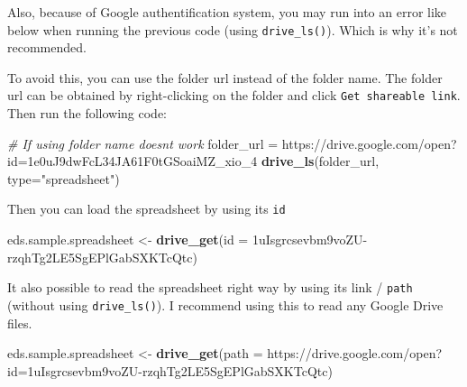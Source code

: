\documentclass[
]{book}
\newenvironment{Shaded}{\begin{snugshade}}{\end{snugshade}}
\newcommand{\CommentTok}[1]{\textcolor[rgb]{0.56,0.35,0.01}{\textit{#1}}}
\newcommand{\DataTypeTok}[1]{\textcolor[rgb]{0.13,0.29,0.53}{#1}}
\newcommand{\KeywordTok}[1]{\textcolor[rgb]{0.13,0.29,0.53}{\textbf{#1}}}
\newcommand{\NormalTok}[1]{#1}
\newcommand{\StringTok}[1]{\textcolor[rgb]{0.31,0.60,0.02}{#1}}
\begin{document}
Also, because of Google authentification system, you may run into an error like below when running the previous code (using \texttt{drive\_ls()}). Which is why it's not recommended.

\begin{Shaded}
\end{Shaded}

To avoid this, you can use the folder url instead of the folder name. The folder url can be obtained by right-clicking on the folder and click \texttt{Get\ shareable\ link}. Then run the following code:

\begin{Shaded}
\begin{Highlighting}[]
\CommentTok{\# If using folder name doesn\textquotesingle{}t work}
\NormalTok{folder\_url =}\StringTok{ \textquotesingle{}https://drive.google.com/open?id=1e0uJ9dwFcL34JA61F0tGSoaiMZ\_xio\_4\textquotesingle{}}
\KeywordTok{drive\_ls}\NormalTok{(folder\_url, }\DataTypeTok{type=}\StringTok{"spreadsheet"}\NormalTok{)}
\end{Highlighting}
\end{Shaded}

Then you can load the spreadsheet by using its \texttt{id}

\begin{Shaded}
\begin{Highlighting}[]
\NormalTok{eds.sample.spreadsheet \textless{}{-}}\StringTok{ }\KeywordTok{drive\_get}\NormalTok{(}\DataTypeTok{id =} \StringTok{\textquotesingle{}1uIsgrcsevbm9voZU{-}rzqhTg2LE5SgEPlGabSXKTcQtc\textquotesingle{}}\NormalTok{)}
\end{Highlighting}
\end{Shaded}

It also possible to read the spreadsheet right way by using its link / \texttt{path} (without using \texttt{drive\_ls()}). I recommend using this to read any Google Drive files.

\begin{Shaded}
\begin{Highlighting}[]
\NormalTok{eds.sample.spreadsheet \textless{}{-}}\StringTok{ }\KeywordTok{drive\_get}\NormalTok{(}\DataTypeTok{path =} \StringTok{\textquotesingle{}https://drive.google.com/open?id=1uIsgrcsevbm9voZU{-}rzqhTg2LE5SgEPlGabSXKTcQtc\textquotesingle{}}\NormalTok{)}
\end{Highlighting}
\end{Shaded}
\end{document}
